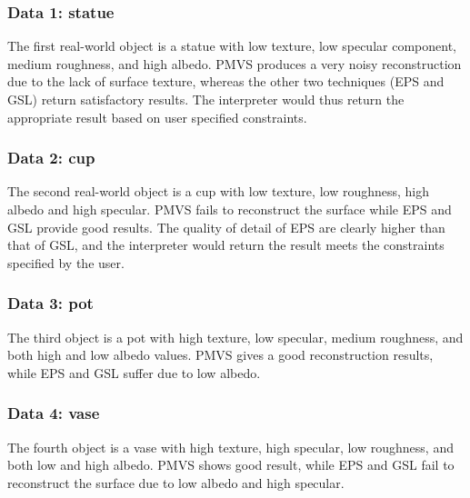 \subsubsection{Data 1: statue}
The first real-world object is a statue with low texture, low specular component, medium roughness, and high albedo. PMVS produces a very noisy reconstruction due to the lack of surface texture, whereas the other two techniques (EPS and GSL) return satisfactory results. The interpreter would thus return the appropriate result based on user specified constraints.

\subsubsection{Data 2: cup}
The second real-world object is a cup with low texture, low roughness, high albedo and high specular. PMVS fails to reconstruct the surface while EPS and GSL provide good results. The quality of detail of EPS are clearly higher than that of GSL, and the interpreter would return the result meets the constraints specified by the user.

\subsubsection{Data 3: pot}
The third object is a pot with high texture, low specular, medium roughness, and both high and low albedo values. PMVS gives a good reconstruction results, while EPS and GSL suffer due to low albedo.

\subsubsection{Data 4: vase}
The fourth object is a vase with high texture, high specular, low roughness, and both low and high albedo. PMVS shows good result, while EPS and GSL fail to reconstruct the surface due to low albedo and high specular.

